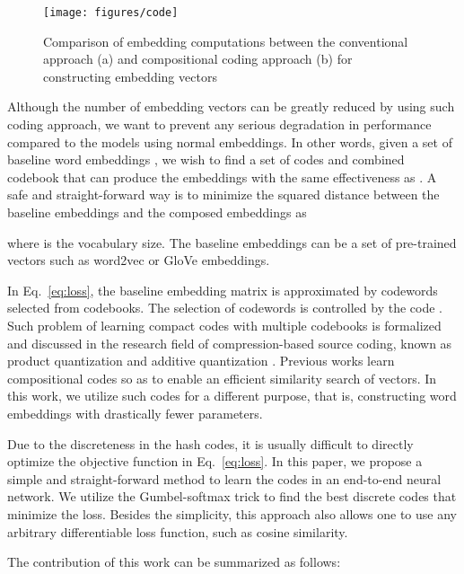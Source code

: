 \documentclass{article} \usepackage{iclr2018_conference_review,times}
\begin{document}
\begin{figure}[t]
  \centering
  \texttt{[image: figures/code]}
  \caption{Comparison of embedding computations between the conventional approach (a) and compositional coding approach (b) for constructing embedding vectors }
  \label{fig:code}
\end{figure}




Although the number of embedding vectors can be greatly reduced by using such coding approach, we want to prevent any serious degradation in performance compared to the models using normal embeddings. In other words, given a set of baseline word embeddings , we wish to find a set of codes  and combined codebook  that can produce the embeddings with the same effectiveness as . A safe and straight-forward way is to minimize the squared distance between the baseline embeddings and the composed embeddings as

where  is the vocabulary size. The baseline embeddings can be a set of pre-trained vectors such as word2vec \citep{Mikolov2013DistributedRO} or GloVe \citep{pennington2014GloVe} embeddings.

In Eq.~\ref{eq:loss}, the baseline embedding matrix  is approximated by  codewords selected from  codebooks. The selection of codewords is controlled by the code . Such problem of learning compact codes with multiple codebooks is formalized and discussed in the research field of compression-based source coding, known as product quantization \citep{Jgou2011ProductQF} and additive quantization \citep{Babenko2014AdditiveQF,Martinez2016RevisitingAQ}. Previous works learn compositional codes so as to enable an efficient similarity search of vectors. In this work, we utilize such codes for a different purpose, that is, constructing word embeddings with drastically fewer parameters.

Due to the discreteness in the hash codes, it is usually difficult to directly optimize the objective function in Eq.~\ref{eq:loss}. In this paper, we propose a simple and straight-forward method to learn the codes in an end-to-end neural network. We utilize the Gumbel-softmax trick \citep{Maddison2016TheCD,Jang2016CategoricalRW} to find the best discrete codes that minimize the loss. Besides the simplicity, this approach also allows one to use any arbitrary differentiable loss function, such as cosine similarity.



The contribution of this work can be summarized as follows:
\end{document}

